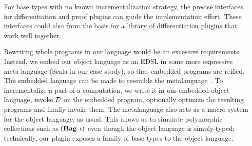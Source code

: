 

For base types with no known incrementalization strategy,
the precise interfaces for differentiation and
proof plugins can guide the implementation effort. These
interfaces could also from the basis for a library of
differentiation plugins that work well together.

Rewriting whole programs in our language would be an excessive
requirements. Instead, we embed our object language as an EDSL in
some more expressive meta-language (Scala in our case study), so
that embedded programs are reified. The embedded language can be
made to resemble the metalanguage~\citep{rompf2010lightweight}.
To incrementalize a part of a computation, we write it in our
embedded object language, invoke $\mathcal{D}$ on the embedded
program, optionally optimize the resulting programs and finally
invoke them. The metalanguage also acts as a macro system for the
object language, as usual. This allows us to simulate polymorphic
collections such as $\Bag*[\Gi]$ even though the object language is
simply-typed; technically, our plugin exposes a family of base
types to the object language.




